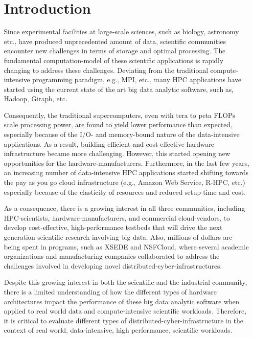 \documentclass[10pt, conference, compsocconf]{IEEEtran}
\begin{document}
\section{Introduction}
Since experimental facilities at large-scale sciences, such as biology, astronomy etc., have produced unprecedented amount of data, scientific communities encounter new challenges in terms of storage and optimal processing. The fundamental computation-model of these scientific applications is rapidly changing to address these challenges. Deviating from the traditional compute-intensive programming paradigm, e.g., MPI, etc., many HPC applications have started using the current state of the art big data analytic software, such as, Hadoop, Giraph, etc. 

Consequently, the traditional supercomputers, even with tera to peta FLOPs scale processing power, are found to yield lower performance than expected, especially because of the I/O- and memory-bound nature of the data-intensive applications. As a result, building efficient and cost-effective hardware infrastructure became more challenging. However, this started opening new opportunities for the hardware-manufacturers. Furthermore, in the last few years, an increasing number of data-intensive HPC applications started shifting towards the pay as you go cloud infrastructure (e.g., Amazon Web Service, R-HPC, etc.) especially because of the elasticity of resources and reduced setup-time and cost. 

As a consequence, there is a growing interest in all three communities, including HPC-scientists, hardware-manufacturers, and commercial cloud-vendors, to develop cost-effective, high-performance testbeds that will drive the next generation scientific research involving big data. Also, millions of dollars are being spent in programs, such as XSEDE and NSFCloud, where several academic organizations and manufacturing companies collaborated to address the challenges involved in developing novel distributed-cyber-infrastructures. 

Despite this growing interest in both the scientific and the industrial community, there is a limited understanding of how the different types of hardware architectures impact the performance of these big data analytic software when applied to real world data and compute-intensive scientific workloads. Therefore, it is critical to evaluate different types of distributed-cyber-infrastructure in the context of real world, data-intensive, high performance, scientific workloads.   
\end{document}
